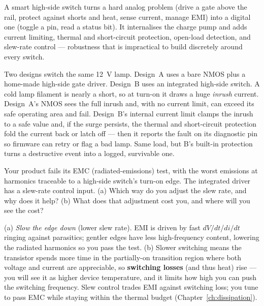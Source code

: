 \documentclass[11pt,a4paper,oneside]{book}
\begin{document}
\begin{keyidea}
A smart high-side switch turns a hard analog problem (drive a gate above the rail,
protect against shorts and heat, sense current, manage EMI) into a digital one
(toggle a pin, read a status bit). It internalises the charge pump and adds
current limiting, thermal and short-circuit protection, open-load detection, and
slew-rate control --- robustness that is impractical to build discretely around
every switch.
\end{keyidea}

\begin{wexample}
Two designs switch the same \qty{12}{\volt} lamp. Design~A uses a bare NMOS plus a
home-made high-side gate driver. Design~B uses an integrated high-side switch.
A cold lamp filament is nearly a short, so at turn-on it draws a huge
\emph{inrush} current. Design~A's NMOS sees the full inrush and, with no current
limit, can exceed its safe operating area and fail. Design~B's internal current
limit clamps the inrush to a safe value and, if the surge persists, the thermal
and short-circuit protection fold the current back or latch off --- then it
reports the fault on its diagnostic pin so firmware can retry or flag a bad lamp.
Same load, but B's built-in protection turns a destructive event into a logged,
survivable one.
\end{wexample}

\begin{exercise}
Your product fails its EMC (radiated-emissions) test, with the worst emissions at
harmonics traceable to a high-side switch's turn-on edge. The integrated driver
has a slew-rate control input. (a) Which way do you adjust the slew rate, and why
does it help? (b) What does that adjustment cost you, and where will you see the
cost?
\end{exercise}
\begin{solution}
(a) \emph{Slow the edge down} (lower slew rate). EMI is driven by fast
$dV/dt$/$di/dt$ ringing against parasitics; gentler edges have less high-frequency
content, lowering the radiated harmonics so you pass the test. (b) Slower
switching means the transistor spends more time in the partially-on transition
region where both voltage and current are appreciable, so \textbf{switching
losses} (and thus heat) rise --- you will see it as higher device temperature, and
it limits how high you can push the switching frequency. Slew control trades EMI
against switching loss; you tune to pass EMC while staying within the thermal
budget (Chapter~\ref{ch:dissipation}).
\end{solution}
\end{document}

